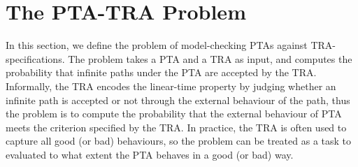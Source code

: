 \section{The PTA-TRA Problem}
In this section, we define the problem of model-checking PTAs against TRA-specifications.
The problem takes a PTA and a TRA as input, and computes the probability that infinite paths under the PTA are accepted by the TRA.
Informally, the TRA encodes the linear-time property by judging whether an infinite path is accepted or not through the external behaviour of the path,
thus the problem is to compute the probability that the external behaviour of PTA meets the criterion specified by the TRA.
In practice, the TRA is often used to capture all good (or bad) behaviours, so the problem can be treated as a task to evaluated to what extent the PTA behaves in a good (or bad) way.

